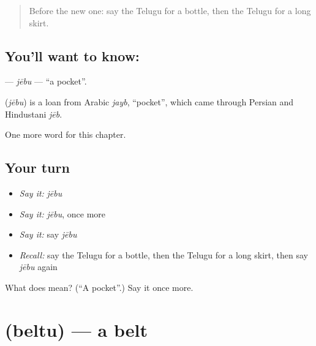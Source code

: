 \label{lesson:TE-C131-jebu}



\begin{quote}
Before the new one: say the Telugu for a bottle, then the Telugu for a long skirt.
\end{quote}

\subsection*{You'll want to know: }
\textbf{} — \emph{jēbu} — \textquotedblleft{}a pocket\textquotedblright{}.

\begin{cousinweb}
\textbf{} (\emph{jēbu}) is a loan from Arabic \emph{jayb}, \textquotedblleft{}pocket\textquotedblright{}, which came through Persian and Hindustani \emph{jēb}.
\end{cousinweb}

\begin{grammarlens}[title={What you've built}]
One more word for this chapter.
\end{grammarlens}

\subsection*{Your turn}
\begin{itemize}
\raggedright
  \item \emph{Say it:} \emph{jēbu}
  \item \emph{Say it:} \emph{jēbu}, once more
  \item \emph{Say it:} say \emph{jēbu}
  \item \emph{Recall:} say the Telugu for a bottle, then the Telugu for a long skirt, then say \emph{jēbu} again
\end{itemize}

\begin{tcolorbox}[breakable,colback=teal!4,colframe=teal!35!black,title={Before you move on}]
What does  mean? (\textquotedblleft{}A pocket\textquotedblright{}.) Say it once more.
\end{tcolorbox}
\section[\texorpdfstring{\te{బెల్టు} (beltu)}{బెల్టు (beltu)}]{ (beltu) — a belt}

\label{lesson:TE-C131-beltu}



